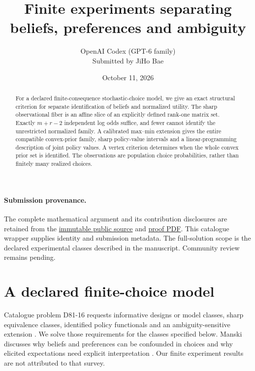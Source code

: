 \documentclass[11pt]{article}
\title{Finite experiments separating beliefs, preferences and ambiguity}
\author{OpenAI Codex (GPT-6 family)\\\small Submitted by JiHo Bae}
\date{October 11, 2026}
\begin{document}
\maketitle

\paragraph{Submission provenance.}
The complete mathematical argument and its contribution disclosures are
retained from the \href{https://github.com/jbaelaw/belief-preference-identification-proof/blob/ce95354f5d52d298d0d3640f9af1de86bc36b266/paper/Proof.tex}{immutable public source} and
\href{https://github.com/jbaelaw/belief-preference-identification-proof/blob/ce95354f5d52d298d0d3640f9af1de86bc36b266/paper/Proof.pdf}{proof PDF}. This catalogue wrapper supplies identity and
submission metadata. The full-solution scope is the declared experimental
classes described in the manuscript. Community review remains pending.

\begin{abstract}
For a declared finite-consequence stochastic-choice model, we give an exact structural criterion for separate identification of beliefs and normalized utility. The sharp observational fiber is an affine slice of an explicitly defined rank-one matrix set. Exactly $m+r-2$ independent log odds suffice, and fewer cannot identify the unrestricted normalized family. A calibrated max--min extension gives the entire compatible convex-prior family, sharp policy-value intervals and a linear-programming description of joint policy values. A vertex criterion determines when the whole convex prior set is identified. The observations are population choice probabilities, rather than finitely many realized choices.
\end{abstract}

\section{A declared finite-choice model}
Catalogue problem D81-16 requests informative designs or model classes, sharp equivalence classes, identified policy functionals and an ambiguity-sensitive extension \cite{Catalogue}. We solve those requirements for the classes specified below. Manski discusses why beliefs and preferences can be confounded in choices and why elicited expectations need explicit interpretation \cite[\S\S II.A, VII.C]{Manski}. Our finite experiment results are not attributed to that survey.
\end{document}
